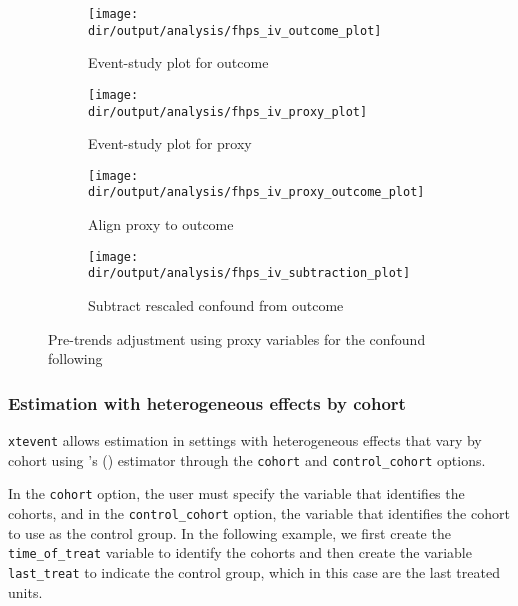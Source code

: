 \documentclass[12pt]{article}
\begin{document}
\begin{figure}[h!]
	\centering
	\begin{subfigure}{0.5\textwidth}
		\centering
		\texttt{[image: \\dir/output/analysis/fhps\_iv\_outcome\_plot]}
		\caption{Event-study plot for outcome}
		\label{fig:overlayfhs1}
	\end{subfigure}%
	\begin{subfigure}{0.5\textwidth}
		\centering
		\texttt{[image: \\dir/output/analysis/fhps\_iv\_proxy\_plot]}
		\caption{Event-study plot for proxy}
		\label{fig:overlayfhs2}
	\end{subfigure}%
	
	\begin{subfigure}{0.5\textwidth}
		\centering
		\texttt{[image: \\dir/output/analysis/fhps\_iv\_proxy\_outcome\_plot]}
		\caption{Align proxy to outcome}
		\label{fig:overlayfhs3}
	\end{subfigure}%
	\begin{subfigure}{0.5\textwidth}
		\centering
		\texttt{[image: \\dir/output/analysis/fhps\_iv\_subtraction\_plot]}
		\caption{Subtract rescaled confound from outcome}
		\label{fig:overlayfhs4}
	\end{subfigure}%
	
	\caption{Pre-trends adjustment using proxy variables for the confound following \cite{freyaldenhoven2019pre}}
	\label{fig:overlayfhs}
\end{figure}


\subsubsection*{Estimation with heterogeneous effects by cohort}

\begin{sloppypar}
	\texttt{xtevent} allows estimation in settings with heterogeneous effects that vary by cohort using \citeauthor{sun2021estimating}'s (\citeyear{sun2021estimating}) estimator through the \texttt{cohort} and \texttt{control\_cohort} options.
\end{sloppypar}
In the \texttt{cohort} option, the user must specify the variable that identifies the cohorts, and in the \texttt{control\_cohort} option, the variable that identifies the cohort to use as the control group.
In the following example, we first create the \texttt{time\_of\_treat} variable to identify the cohorts and then create the variable \texttt{last\_treat} to indicate the control group, which in this case are the last treated units.
\end{document}
